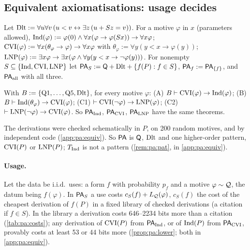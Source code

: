 \subsection{Equivalent axiomatisations: usage decides}\label{sec:pa:equiv}

Let $\mathrm{Dlt}:=\forall u\forall v\,(u<v\leftrightarrow\exists z\,(u+Sz=v))$. For a motive $\varphi$ in $x$ (parameters allowed), $\mathrm{Ind}(\varphi):=\varphi(0)\wedge\forall x(\varphi\to\varphi(Sx))\to\forall x\varphi$; $\mathrm{CVI}(\varphi):=\forall x(\theta_\varphi\to\varphi)\to\forall x\varphi$ with $\theta_\varphi:=\forall y(y<x\to\varphi(y))$; $\mathrm{LNP}(\varphi):=\exists x\varphi\to\exists x(\varphi\wedge\forall y(y<x\to\neg\varphi(y)))$. For nonempty $S\subseteq\{\mathrm{Ind},\mathrm{CVI},\mathrm{LNP}\}$ let $\mathsf{PA}_S:=\mathsf{Q}+\mathrm{Dlt}+\{f(P):f\in S\}$, $\mathsf{PA}_f:=\mathsf{PA}_{\{f\}}$, and $\mathsf{PA}_{\mathrm{all}}$ with all three.

\begin{proposition}\pabrk{}\label{prop:pa:equiv}
With $B:=\{\mathrm{Q1},\dots,\mathrm{Q5},\mathrm{Dlt}\}$, for every motive $\varphi$: (A) $B\vdash\mathrm{CVI}(\varphi)\to\mathrm{Ind}(\varphi)$; (B) $B\vdash\mathrm{Ind}(\theta_\varphi)\to\mathrm{CVI}(\varphi)$; (C1) $\vdash\mathrm{CVI}(\neg\varphi)\to\mathrm{LNP}(\varphi)$; (C2) $\vdash\mathrm{LNP}(\neg\varphi)\to\mathrm{CVI}(\varphi)$. So $\mathsf{PA}_{\mathrm{Ind}}$, $\mathsf{PA}_{\mathrm{CVI}}$, $\mathsf{PA}_{\mathrm{LNP}}$ have the same theorems.
\end{proposition}

\noindent The derivations were checked schematically in $P$, on 200 random motives, and by independent code (\cref{app:pa:equiv}). So $\mathsf{PA}$ is $\mathsf{Q}$, $\mathrm{Dlt}$ and one higher-order pattern, $\mathrm{CVI}(P)$ or $\mathrm{LNP}(P)$; $T_{\mathrm{Ind}}$ is not a pattern (\cref{rem:pa:pat}, in \cref{app:pa:equiv}).

\paragraph{Usage.} Let the data be i.i.d.\ uses: a form $f$ with probability $p_f$ and a motive $\varphi\sim\mathcal{Q}$, the datum being $f(\varphi)$. In $\mathsf{PA}_S$ a use costs $c_S(f)+L_{\mathcal{Q}}(\varphi)$, $c_S(f)$ the cost of the cheapest derivation of $f(P)$ in a fixed library of checked derivations (a citation if $f\in S$). In the library a derivation costs 646--2234 bits more than a citation (\cref{tab:pa:costs}); any derivation of $\mathrm{CVI}(P)$ from $\mathsf{PA}_{\mathrm{Ind}}$, or of $\mathrm{Ind}(P)$ from $\mathsf{PA}_{\mathrm{CVI}}$, provably costs at least 53 or 44 bits more (\cref{prop:pa:lower}; both in \cref{app:pa:equiv}).

